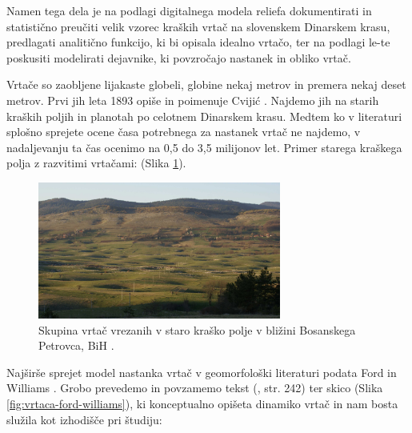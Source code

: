 \documentclass[a4paper, twoside, 12pt]{book}
\begin{document}
Namen tega dela je na podlagi digitalnega modela reliefa dokumentirati in statistično preučiti velik vzorec kraških vrtač na slovenskem Dinarskem krasu, predlagati analitično funkcijo, ki bi opisala idealno vrtačo, ter na podlagi le-te poskusiti modelirati dejavnike, ki povzročajo nastanek in obliko vrtač.

Vrtače so zaobljene lijakaste globeli, globine nekaj metrov in premera nekaj deset metrov. Prvi jih leta 1893 opiše in poimenuje Cvijić \cite{cvijic1893}. Najdemo jih na starih kraških poljih in planotah po celotnem Dinarskem krasu. Medtem ko v literaturi splošno sprejete ocene časa potrebnega za nastanek vrtač ne najdemo, v nadaljevanju ta čas ocenimo na 0,5 do 3,5 milijonov let. Primer starega kraškega polja z razvitimi vrtačami: (Slika \ref{fig:vrtace-bpetrovac}). 

  \begin{figure}[h]
    \begin{center}
      \includegraphics[width=8cm]{slike/bpetrovac}
    \end{center}
    \caption{Skupina vrtač vrezanih v staro kraško polje v bližini Bosanskega Petrovca, BiH \cite{bpetrovac}.}
    \label{fig:vrtace-bpetrovac}
  \end{figure}

Najširše sprejet model nastanka vrtač v geomorfološki literaturi podata Ford in Williams \cite{ford2007karst}. Grobo prevedemo in povzamemo tekst (\cite{ford2007karst}, str. 242) ter skico (Slika \ref{fig:vrtaca-ford-williams}), ki konceptualno opišeta dinamiko vrtač in nam bosta služila kot izhodišče pri študiju:
\end{document}
